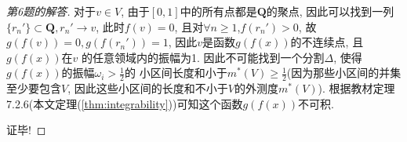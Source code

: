\documentclass[a4paper,12pt]{article}
\begin{document}
\begin{proof}[第6题的解答]
  对于$v\in V$, 由于$[0,1]$中的所有点都是$\mathbf Q$的聚点, 因此可以找到一列
  $\{r_n'\}\subset \mathbf Q, r_n'\to v$, 此时$f(v)=0$, 且对$\forall n\geq 1$,$f(r_n')>0$,
  故$g(f(v))=0, g(f(r_n'))=1$, 因此$v$是函数$g(f(x))$的不连续点, 且$g(f(x))$在$v$
  的任意领域内的振幅为1.
  因此不可能找到一个分割$\Delta$, 使得$g(f(x))$的振幅$\omega_i>\frac{1}{2}$的
  小区间长度和小于$m^*(V)\geq \frac{1}{2}$(因为那些小区间的并集至少要包含$V$, 
  因此这些小区间的长度和不小于$V$的外测度$m^*(V)$).
  根据教材定理7.2.6(本文定理(\ref{thm:integrability}))可知这个函数$g(f(x))$不可积.

  证毕!

\end{proof}

%

%
\end{document}

